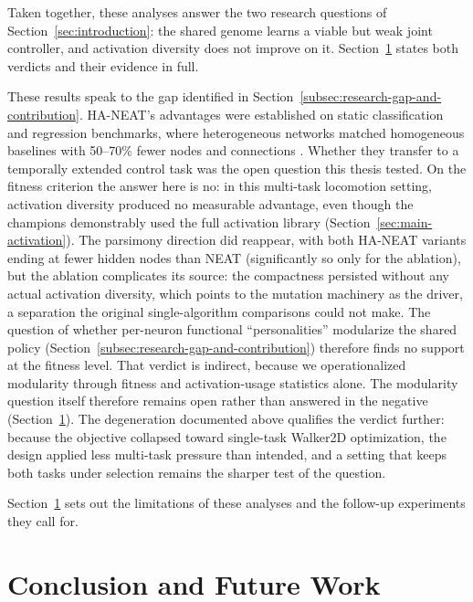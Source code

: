 \documentclass[12pt]{article}
\begin{document}
Taken together, these analyses answer the two research questions of Section~\ref{sec:introduction}: the shared genome learns a viable but weak joint controller, and activation diversity does not improve on it.
Section~\ref{sec:conclusion-and-future-work} states both verdicts and their evidence in full.

These results speak to the gap identified in Section~\ref{subsec:research-gap-and-contribution}.
HA-NEAT's advantages were established on static classification and regression benchmarks, where heterogeneous networks matched homogeneous baselines with 50--70\% fewer nodes and connections \parencite{hagg_evolving_2017}. Whether they transfer to a temporally extended control task was the open question this thesis tested.
On the fitness criterion the answer here is no: in this multi-task locomotion setting, activation diversity produced no measurable advantage, even though the champions demonstrably used the full activation library (Section~\ref{sec:main-activation}).
The parsimony direction did reappear, with both HA-NEAT variants ending at fewer hidden nodes than NEAT (significantly so only for the ablation), but the ablation complicates its source: the compactness persisted without any actual activation diversity, which points to the mutation machinery as the driver, a separation the original single-algorithm comparisons could not make.
The question of whether per-neuron functional ``personalities'' modularize the shared policy (Section~\ref{subsec:research-gap-and-contribution}) therefore finds no support at the fitness level.
That verdict is indirect, because we operationalized modularity through fitness and activation-usage statistics alone. The modularity question itself therefore remains open rather than answered in the negative (Section~\ref{sec:conclusion-and-future-work}).
The degeneration documented above qualifies the verdict further: because the objective collapsed toward single-task Walker2D optimization, the design applied less multi-task pressure than intended, and a setting that keeps both tasks under selection remains the sharper test of the question.

Section~\ref{sec:conclusion-and-future-work} sets out the limitations of these analyses and the follow-up experiments they call for.




\section{Conclusion and Future Work}
\label{sec:conclusion-and-future-work}
\end{document}

